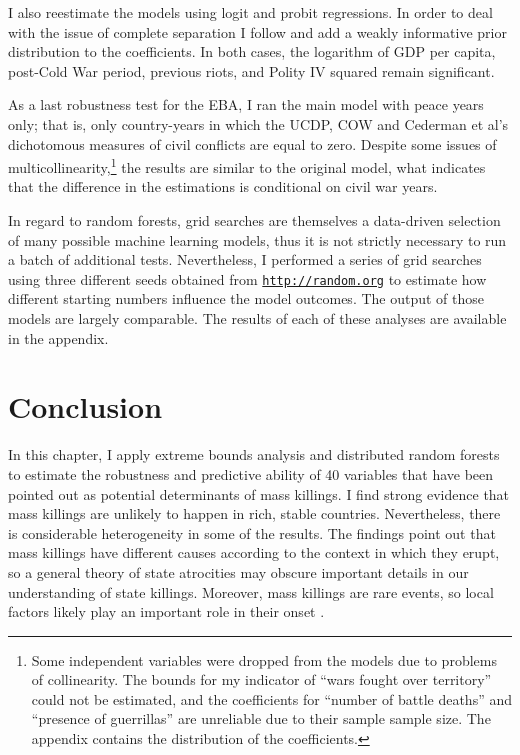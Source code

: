 I also reestimate the models using logit and probit regressions. In order to deal with the issue of complete separation \citep{bell2015questioning,zorn2005solution} I follow \citet{gelman2008weakly} and add a weakly informative prior distribution to the coefficients. In both cases, the logarithm of GDP per capita, post-Cold War period, previous riots, and Polity IV squared remain significant.

As a last robustness test for the EBA, I ran the main model with peace years only; that is, only country-years in which the UCDP, COW and Cederman et al's dichotomous measures of civil conflicts are equal to zero. Despite some issues of multicollinearity,\footnote{Some independent variables were dropped from the models due to problems of collinearity. The bounds for my indicator of ``wars fought over territory'' could not be estimated, and the coefficients for ``number of battle deaths'' and ``presence of guerrillas'' are unreliable due to their sample sample size. The appendix contains the distribution of the coefficients.} the results are similar to the original model, what indicates that the difference in the estimations is conditional on civil war years.
	
In regard to random forests, grid searches are themselves a data-driven selection of many possible machine learning models, thus it is not strictly necessary to run a batch of additional tests. Nevertheless, I performed a series of grid searches using three different seeds obtained from \href{https://random.org}{\texttt{http://random.org}} to estimate how different starting numbers influence the model outcomes. The output of those models are largely comparable. The results of each of these analyses are available in the appendix.

\section{Conclusion}
\label{sec:conclusion}
	
In this chapter, I apply extreme bounds analysis and distributed random forests to estimate the robustness and predictive ability of 40 variables that have been pointed out as potential determinants of mass killings. I find strong evidence that mass killings are unlikely to happen in rich, stable countries. Nevertheless, there is considerable heterogeneity in some of the results. The findings point out that mass killings have different causes according to the context in which they erupt, so a general theory of state atrocities may obscure important details in our understanding of state killings. Moreover, mass killings are rare events, so local factors likely play an important role in their onset \citep{straus2007second,straus2012destroy}.
	

